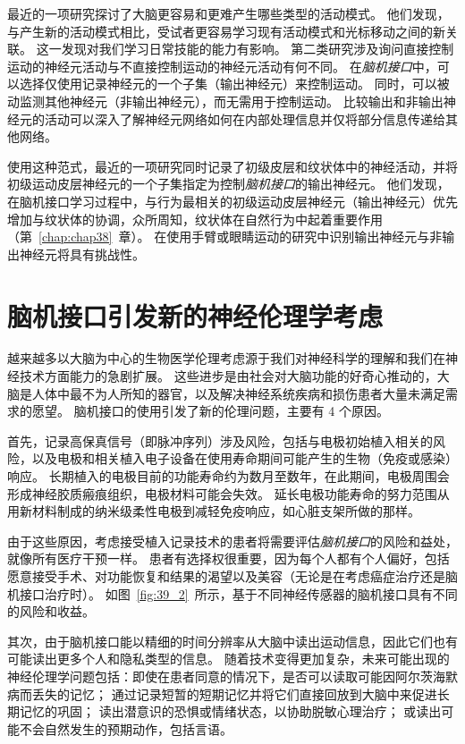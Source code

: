 最近的一项研究探讨了大脑更容易和更难产生哪些类型的活动模式。
他们发现，与产生新的活动模式相比，受试者更容易学习现有活动模式和光标移动之间的新关联。
这一发现对我们学习日常技能的能力有影响。
第二类研究涉及询问直接控制运动的神经元活动与不直接控制运动的神经元活动有何不同。
在\textit{脑机接口}中，可以选择仅使用记录神经元的一个子集（输出神经元）来控制运动。
同时，可以被动监测其他神经元（非输出神经元），而无需用于控制运动。
比较输出和非输出神经元的活动可以深入了解神经元网络如何在内部处理信息并仅将部分信息传递给其他网络。


使用这种范式，最近的一项研究同时记录了初级皮层和纹状体中的神经活动，并将初级运动皮层神经元的一个子集指定为控制\textit{脑机接口}的输出神经元。
他们发现，在脑机接口学习过程中，与行为最相关的初级运动皮层神经元（输出神经元）优先增加与纹状体的协调，众所周知，纹状体在自然行为中起着重要作用（第~\ref{chap:chap38}~章）。
在使用手臂或眼睛运动的研究中识别输出神经元与非输出神经元将具有挑战性。



\section{脑机接口引发新的神经伦理学考虑}

越来越多以大脑为中心的生物医学伦理考虑源于我们对神经科学的理解和我们在神经技术方面能力的急剧扩展。
这些进步是由社会对大脑功能的好奇心推动的，大脑是人体中最不为人所知的器官，以及解决神经系统疾病和损伤患者大量未满足需求的愿望。
脑机接口的使用引发了新的伦理问题，主要有 4 个原因。


首先，记录高保真信号（即脉冲序列）涉及风险，包括与电极初始植入相关的风险，以及电极和相关植入电子设备在使用寿命期间可能产生的生物（免疫或感染）响应。
长期植入的电极目前的功能寿命约为数月至数年，在此期间，电极周围会形成神经胶质瘢痕组织，电极材料可能会失效。
延长电极功能寿命的努力范围从用新材料制成的纳米级柔性电极到减轻免疫响应，如心脏支架所做的那样。


由于这些原因，考虑接受植入记录技术的患者将需要评估\textit{脑机接口}的风险和益处，就像所有医疗干预一样。
患者有选择权很重要，因为每个人都有个人偏好，包括愿意接受手术、对功能恢复和结果的渴望以及美容（无论是在考虑癌症治疗还是脑机接口治疗时）。
如图~\ref{fig:39_2}~所示，基于不同神经传感器的脑机接口具有不同的风险和收益。


其次，由于脑机接口能以精细的时间分辨率从大脑中读出运动信息，因此它们也有可能读出更多个人和隐私类型的信息。
随着技术变得更加复杂，未来可能出现的神经伦理学问题包括：即使在患者同意的情况下，是否可以读取可能因阿尔茨海默病而丢失的记忆；
通过记录短暂的短期记忆并将它们直接回放到大脑中来促进长期记忆的巩固；
读出潜意识的恐惧或情绪状态，以协助脱敏心理治疗；
或读出可能不会自然发生的预期动作，包括言语。


